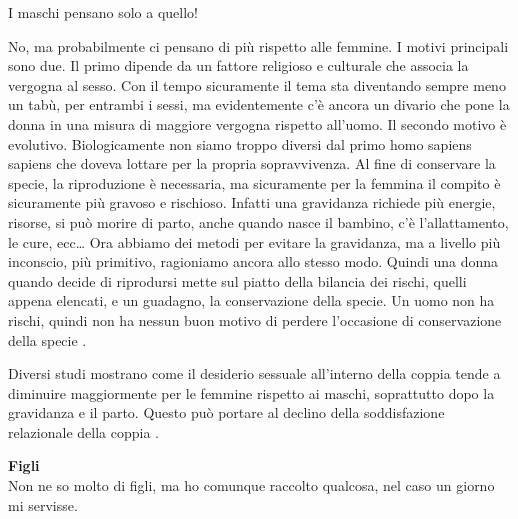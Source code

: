 \documentclass[12pt]{book} %
\begin{document}
\bigskip
\begin{mdframed}[linewidth=1pt]
I maschi pensano solo a quello!

No, ma probabilmente ci pensano di più rispetto alle femmine. I motivi principali sono due. Il primo dipende da un
fattore religioso e culturale che associa la vergogna al sesso. Con il tempo sicuramente il tema sta diventando sempre
meno un tabù, per entrambi i sessi, ma evidentemente c'è ancora un divario che pone la donna in
una misura di maggiore vergogna rispetto all'uomo. Il secondo motivo è evolutivo. Biologicamente
non siamo troppo diversi dal primo homo sapiens sapiens che doveva lottare per la propria sopravvivenza. Al fine di
conservare la specie, la riproduzione è necessaria, ma sicuramente per la femmina il compito è sicuramente più gravoso
e rischioso. Infatti una gravidanza richiede più energie, risorse, si può morire di parto, anche quando nasce il
bambino, c'è l'allattamento, le cure, ecc… Ora abbiamo dei metodi per evitare
la gravidanza, ma a livello più inconscio, più primitivo, ragioniamo ancora allo stesso modo. Quindi una donna quando
decide di riprodursi mette sul piatto della bilancia dei rischi, quelli appena elencati, e un guadagno, la
conservazione della specie. Un uomo non ha rischi, quindi non ha nessun buon motivo di perdere
l'occasione di conservazione della specie
.

Diversi studi mostrano come il desiderio sessuale all'interno della coppia tende a diminuire
maggiormente per le femmine rispetto ai maschi, soprattutto dopo la gravidanza e il parto. Questo può portare al
declino della soddisfazione relazionale della coppia
.
\end{mdframed}

\noindent \textbf{\large Figli} \\
Non ne so molto di figli, ma ho comunque raccolto qualcosa, nel caso un giorno mi servisse.
\end{document}
